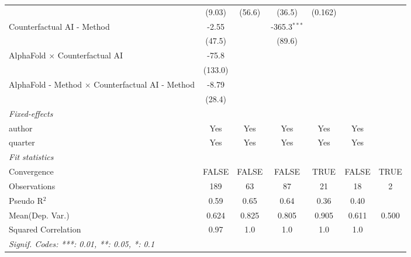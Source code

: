 \begin{tabular}{lcccccc}
                                                           & (9.03)   & (56.6)         & (36.5)         & (0.162) &              &   \\   
   Counterfactual AI - Method                              & -2.55    &                & -365.3$^{***}$ &         &              &   \\   
                                                           & (47.5)   &                & (89.6)         &         &              &   \\   
   AlphaFold $\times$ Counterfactual AI                    & -75.8    &                &                &         &              &   \\   
                                                           & (133.0)  &                &                &         &              &   \\   
   AlphaFold - Method $\times$ Counterfactual AI - Method  & -8.79    &                &                &         &              &   \\   
                                                           & (28.4)   &                &                &         &              &   \\   
   \midrule
   \emph{Fixed-effects}\\
   author                                                  & Yes      & Yes            & Yes            & Yes     & Yes          & \\  
   quarter                                                 & Yes      & Yes            & Yes            & Yes     & Yes          & \\  
   \midrule
   \emph{Fit statistics}\\
   Convergence                                             &FALSE     & FALSE          & FALSE          & TRUE    & FALSE        & TRUE\\  
   Observations                                            & 189      & 63             & 87             & 21      & 18           & 2\\  
   Pseudo R$^2$                                            & 0.59     & 0.65           & 0.64           & 0.36    & 0.40         & \\  
Mean(Dep. Var.) & 0.624 & 0.825 & 0.805 & 0.905 & 0.611 & 0.500 \\
   Squared Correlation                                     & 0.97     & 1.0            & 1.0            & 1.0     & 1.0          & \\  
   \midrule \midrule
   \multicolumn{7}{l}{\emph{Signif. Codes: ***: 0.01, **: 0.05, *: 0.1}}\\
\end{tabular}
\par\endgroup
